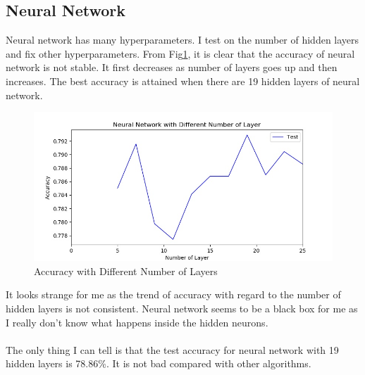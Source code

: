 \documentclass[11pt]{article}
\begin{document}
\subsection{Neural Network}
Neural network has many hyperparameters. I test on the number of hidden layers and fix other hyperparameters. From Fig\ref{fig:adult_nn}, it is clear that the accuracy of neural network is not stable. It first decreases as number of layers goes up and then increases. The best accuracy is attained when there are 19 hidden layers of neural network. 
\begin{figure}[h!]
  \includegraphics[width=\linewidth]{./adult/nn_num_layer.jpg}
  \caption{Accuracy with Different Number of Layers}
  \label{fig:adult_nn}
\end{figure}
It looks strange for me as the trend of accuracy with regard to the number of hidden layers is not consistent. Neural network seems to be a black box for me as I really don't know what happens inside the hidden neurons. \\
\\The only thing I can tell is that the test accuracy for neural network with 19 hidden layers is 78.86\%. It is not bad compared with other algorithms.
\end{document}
